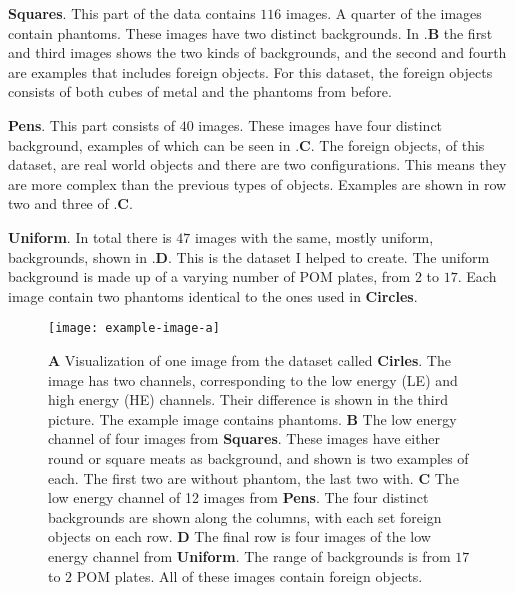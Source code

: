 \textbf{Squares}. This part of the data contains $116$ images. A quarter of the images contain phantoms. These images have two distinct backgrounds. In .\textbf{B} the first and third images shows the two kinds of backgrounds, and the second and fourth are examples that includes foreign objects. For this dataset, the foreign objects consists of both cubes of metal and the phantoms from before.

\textbf{Pens}. This part consists of $40$ images. These images have four distinct background, examples of which can be seen in .\textbf{C}.
The foreign objects, of this dataset, are real world objects and there are two configurations. This means they are more complex than the previous types of objects. Examples are shown in row two and three of .\textbf{C}. 

\textbf{Uniform}. In total there is $47$ images with the same, mostly uniform, backgrounds, shown in .\textbf{D}. This is the dataset I helped to create. The uniform background is made up of a varying number of POM plates, from $2$ to $17$. Each image contain two phantoms identical to the ones used in \textbf{Circles}.

\begin{figure}[h]
	\vspace*{-1cm}
	\begin{whole}
		\texttt{[image: example-image-a]}
		\caption{
		\textbf{A} Visualization of one image from the dataset called \textbf{Cirles}. The image has two channels, corresponding to the low energy (LE) and high energy (HE) channels. Their difference is shown in the third picture. The example image contains phantoms.
		\textbf{B} The low energy channel of four images from \textbf{Squares}. These images have either round or square meats as background, and shown is two examples of each. The first two are without phantom, the last two with. 
		\textbf{C} The low energy channel of 12 images from \textbf{Pens}. The four distinct backgrounds are shown along the columns, with each set foreign objects on each row.
		\textbf{D} The final row is four images of the low energy channel from \textbf{Uniform}. The range of backgrounds is from $17$ to $2$ POM plates. All of these images contain foreign objects.
		}
		\label{fig:full_data}
	\end{whole}
\end{figure}

